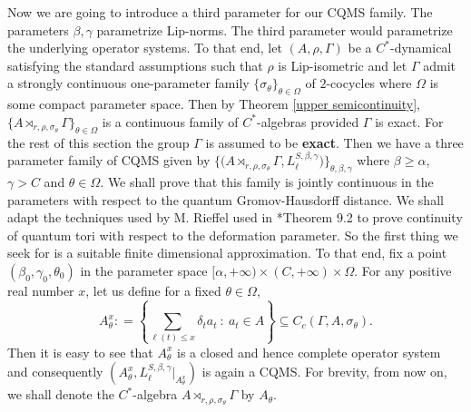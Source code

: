 \documentclass[a4paper,11pt,reqno]{amsart}
\theoremstyle{plain}
\theoremstyle{mainthmstyle}
\theoremstyle{named}
\numberwithin{equation}{section}
\begin{document}
Now we are going to introduce a third parameter for our CQMS family. The parameters $\beta,\gamma$ parametrize Lip-norms. The third parameter would parametrize the underlying operator systems. To that end, let $(A,\rho,\Gamma)$ be a $C^{\ast}$-dynamical satisfying the standard assumptions such that $\rho$ is Lip-isometric and let $\Gamma$ admit a strongly continuous one-parameter family $\{\sigma_{\theta}\}_{\theta\in\Omega}$ of $2$-cocycles where $\Omega$ is some compact parameter space. Then by  Theorem \ref{upper semicontinuity}, $\{A\rtimes_{r,\rho,\sigma_{\theta}}\Gamma\}_{\theta\in\Omega}$ is a continuous family of $C^{\ast}$-algebras provided $\Gamma$ is exact. For the rest of this section the group $\Gamma$ is assumed to be {\bf exact}. Then we have a three parameter family of CQMS given by $\{\big(A\rtimes_{r,\rho,\sigma_{\theta}}\Gamma,L^{S,\beta,\gamma}_{\ell}\big)\}_{\theta,\beta,\gamma}$ where $\beta\ge \alpha$, $\gamma>C$ and $\theta\in\Omega$. We shall prove that this family is jointly continuous in the parameters with respect to the quantum Gromov-Hausdorff distance. We shall adapt the techniques used by M. Rieffel used in \cite{Rieffel-Gromov}*{Theorem 9.2} to prove continuity of quantum tori with respect to the deformation parameter. So the first thing we seek for is a suitable finite dimensional approximation. To that end, fix a point $(\beta_0,\gamma_0,\theta_0)$ in the parameter space $[\alpha,+\infty)\times(C,+\infty)\times\Omega$. For any positive real number $x$, let us define for a fixed $\theta\in \Omega$,
\begin{displaymath}
    A_{\theta}^{x} : = \left \{\sum\limits_{\ell (t) \leq x} \delta_t a_t\ :\ a_t \in A \right \} \subseteq C_c \left (\Gamma, A, \sigma_{\theta} \right ).
\end{displaymath}  
Then it is easy to see that $A_{\theta}^{x}$ is a closed and hence complete operator system and consequently $(A_{\theta}^{x},L^{S,\beta,\gamma}_{\ell}\big\rvert_{A^{x}_{\theta}})$ is again a CQMS. For brevity, from now on, we shall denote the $C^{\ast}$-algebra $A\rtimes_{r,\rho,\sigma_{\theta}}\Gamma$ by $A_{\theta}$.
\end{document}
